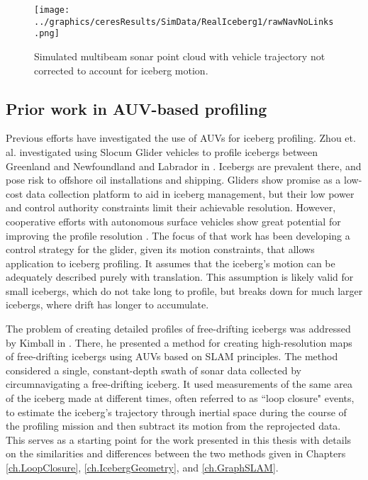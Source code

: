 \begin{figure}[!htb]
   \centering
   \texttt{[image: ../graphics/ceresResults/SimData/RealIceberg1/rawNavNoLinks.png]} %
   \caption{Simulated multibeam sonar point cloud with vehicle trajectory not corrected to account for iceberg motion.}
   \label{fig:Challenge}
\end{figure}

\subsection{Prior work in AUV-based profiling}

Previous efforts have investigated the use of AUVs for iceberg profiling. 
Zhou et. al. investigated using Slocum Glider vehicles to profile icebergs between Greenland and Newfoundland and Labrador in \cite{Zhou2014}. Icebergs are prevalent there, and pose risk to offshore oil installations and shipping. Gliders show promise as a low-cost data collection platform to aid in iceberg management, but their low power and control authority constraints limit their achievable resolution. However, cooperative efforts with autonomous surface vehicles show great potential for improving the profile resolution \cite{Smith2014}. The focus of that work has been developing a control strategy for the glider, given its motion constraints, that allows application to iceberg profiling. It assumes that the iceberg's motion can be adequately described purely with translation. This assumption is likely valid for small icebergs, which do not take long to profile, but breaks down for much larger icebergs, where drift has longer to accumulate. 

The problem of creating detailed profiles of free-drifting icebergs was addressed by Kimball in \cite{Kimball2011b}. There, he presented a method for creating high-resolution maps of free-drifting icebergs using AUVs based on SLAM principles. The method considered a single, constant-depth swath of sonar data collected by circumnavigating a free-drifting iceberg. It used measurements of the same area of the iceberg made at different times, often referred to as  ``loop closure" events, to estimate the iceberg's trajectory through inertial space during the course of the profiling mission and then subtract its motion from the reprojected data. This serves as a starting point for the work presented in this thesis with details on the similarities and differences between the two methods given in Chapters \ref{ch.LoopClosure}, \ref{ch.IcebergGeometry}, and \ref{ch.GraphSLAM}.

